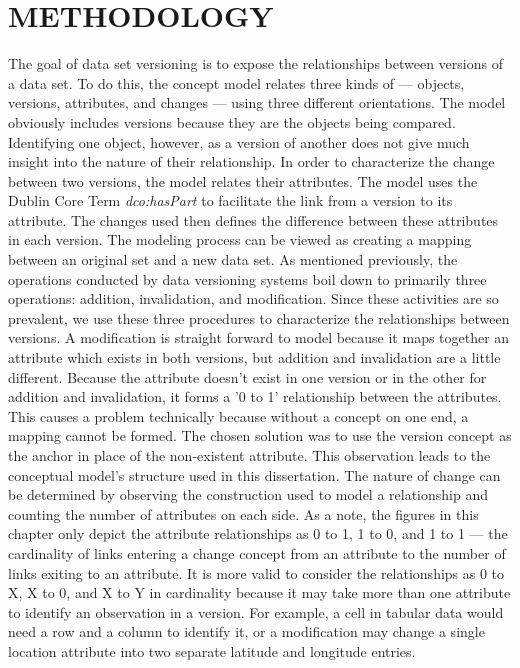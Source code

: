 
\chapter{METHODOLOGY}\label{ch:model}

The goal of data set versioning is to expose the relationships between versions of a data set.
To do this, the concept model relates three kinds of --- objects, versions, attributes, and changes --- using three different orientations.
The model obviously includes versions because they are the objects being compared.
Identifying one object, however, as a version of another does not give much insight into the nature of their relationship.
In order to characterize the change between two versions, the model relates their attributes.
The model uses the Dublin Core Term \textit{dco:hasPart} to facilitate the link from a version to its attribute.
The changes used then defines the difference between these attributes in each version.
The modeling process can be viewed as creating a mapping between an original set and a new data set.
As mentioned previously, the operations conducted by data versioning systems boil down to primarily three operations: addition, invalidation, and modification.
Since these activities are so prevalent, we use these three procedures to characterize the relationships between versions.
A modification is straight forward to model because it maps together an attribute which exists in both versions, but addition and invalidation are a little different.
Because the attribute doesn't exist in one version or in the other for addition and invalidation, it forms a '0 to 1' relationship between the attributes.
This causes a problem technically because without a concept on one end, a mapping cannot be formed.
The chosen solution was to use the version concept as the anchor in place of the non-existent attribute.
This observation leads to the conceptual model's structure used in this dissertation.
The nature of change can be determined by observing the construction used to model a relationship and counting the number of attributes on each side.
As a note, the figures in this chapter only depict the attribute relationships as 0 to 1, 1 to 0, and 1 to 1 --- the cardinality of links entering a change concept from an attribute to the number of links exiting to an attribute.
It is more valid to consider the relationships as 0 to X, X to 0, and X to Y in cardinality because it may take more than one attribute to identify an observation in a version.
For example, a cell in tabular data would need a row and a column to identify it, or a modification may change a single location attribute into two separate latitude and longitude entries.

